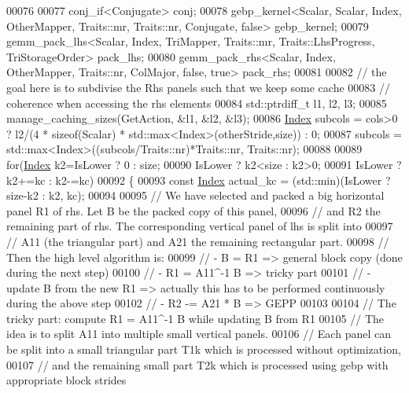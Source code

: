 \begin{DoxyCode}
00076 
00077     conj\_if<Conjugate> conj;
00078     gebp\_kernel<Scalar, Scalar, Index, OtherMapper, Traits::mr, Traits::nr, Conjugate, false> gebp\_kernel;
00079     gemm\_pack\_lhs<Scalar, Index, TriMapper, Traits::mr, Traits::LhsProgress, TriStorageOrder> pack\_lhs;
00080     gemm\_pack\_rhs<Scalar, Index, OtherMapper, Traits::nr, ColMajor, false, true> pack\_rhs;
00081 
00082     \textcolor{comment}{// the goal here is to subdivise the Rhs panels such that we keep some cache}
00083     \textcolor{comment}{// coherence when accessing the rhs elements}
00084     std::ptrdiff\_t l1, l2, l3;
00085     manage\_caching\_sizes(GetAction, &l1, &l2, &l3);
00086     \hyperlink{namespace_eigen_a62e77e0933482dafde8fe197d9a2cfde}{Index} subcols = cols>0 ? l2/(4 * \textcolor{keyword}{sizeof}(Scalar) * std::max<Index>(otherStride,size)) : 0;
00087     subcols = std::max<Index>((subcols/Traits::nr)*Traits::nr, Traits::nr);
00088 
00089     \textcolor{keywordflow}{for}(\hyperlink{namespace_eigen_a62e77e0933482dafde8fe197d9a2cfde}{Index} k2=IsLower ? 0 : size;
00090         IsLower ? k2<size : k2>0;
00091         IsLower ? k2+=kc : k2-=kc)
00092     \{
00093       \textcolor{keyword}{const} \hyperlink{namespace_eigen_a62e77e0933482dafde8fe197d9a2cfde}{Index} actual\_kc = (std::min)(IsLower ? size-k2 : k2, kc);
00094 
00095       \textcolor{comment}{// We have selected and packed a big horizontal panel R1 of rhs. Let B be the packed copy of this
       panel,}
00096       \textcolor{comment}{// and R2 the remaining part of rhs. The corresponding vertical panel of lhs is split into}
00097       \textcolor{comment}{// A11 (the triangular part) and A21 the remaining rectangular part.}
00098       \textcolor{comment}{// Then the high level algorithm is:}
00099       \textcolor{comment}{//  - B = R1                    => general block copy (done during the next step)}
00100       \textcolor{comment}{//  - R1 = A11^-1 B             => tricky part}
00101       \textcolor{comment}{//  - update B from the new R1  => actually this has to be performed continuously during the above
       step}
00102       \textcolor{comment}{//  - R2 -= A21 * B             => GEPP}
00103 
00104       \textcolor{comment}{// The tricky part: compute R1 = A11^-1 B while updating B from R1}
00105       \textcolor{comment}{// The idea is to split A11 into multiple small vertical panels.}
00106       \textcolor{comment}{// Each panel can be split into a small triangular part T1k which is processed without optimization,}
00107       \textcolor{comment}{// and the remaining small part T2k which is processed using gebp with appropriate block strides}

\end{DoxyCode}
